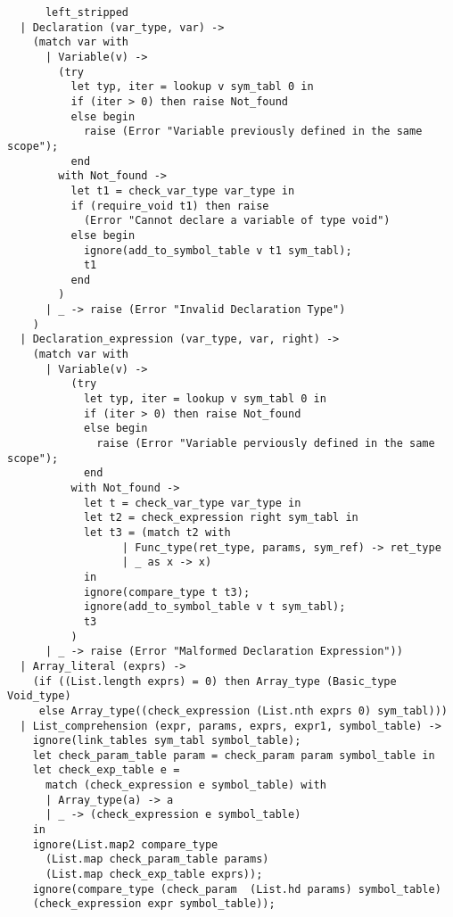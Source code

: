 \begin{verbatim}
      left_stripped
  | Declaration (var_type, var) ->
    (match var with
      | Variable(v) ->
        (try
          let typ, iter = lookup v sym_tabl 0 in
          if (iter > 0) then raise Not_found
          else begin
            raise (Error "Variable previously defined in the same scope");
          end
        with Not_found ->
          let t1 = check_var_type var_type in
          if (require_void t1) then raise
            (Error "Cannot declare a variable of type void")
          else begin
            ignore(add_to_symbol_table v t1 sym_tabl);
            t1
          end
        )
      | _ -> raise (Error "Invalid Declaration Type")
    )
  | Declaration_expression (var_type, var, right) ->
    (match var with
      | Variable(v) ->
          (try
            let typ, iter = lookup v sym_tabl 0 in
            if (iter > 0) then raise Not_found
            else begin
              raise (Error "Variable perviously defined in the same scope");
            end
          with Not_found ->
            let t = check_var_type var_type in
            let t2 = check_expression right sym_tabl in
            let t3 = (match t2 with
                  | Func_type(ret_type, params, sym_ref) -> ret_type
                  | _ as x -> x)
            in
            ignore(compare_type t t3);
            ignore(add_to_symbol_table v t sym_tabl);
            t3
          )
      | _ -> raise (Error "Malformed Declaration Expression"))
  | Array_literal (exprs) ->
    (if ((List.length exprs) = 0) then Array_type (Basic_type Void_type)
     else Array_type((check_expression (List.nth exprs 0) sym_tabl)))
  | List_comprehension (expr, params, exprs, expr1, symbol_table) ->
    ignore(link_tables sym_tabl symbol_table);
    let check_param_table param = check_param param symbol_table in
    let check_exp_table e =
      match (check_expression e symbol_table) with
      | Array_type(a) -> a
      | _ -> (check_expression e symbol_table)
    in
    ignore(List.map2 compare_type
      (List.map check_param_table params)
      (List.map check_exp_table exprs));
    ignore(compare_type (check_param  (List.hd params) symbol_table)
    (check_expression expr symbol_table));


\end{verbatim}
